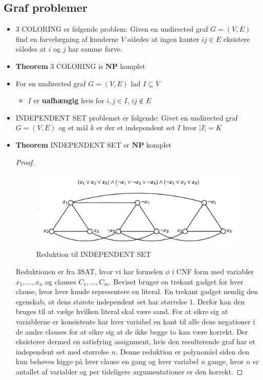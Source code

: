 \subsection{Graf problemer}
\begin{itemize}
  \item 3 COLORING er følgende problem: Given en undirected graf $G=(V,E)$ find en farvelægning af knuderne $V$ således at ingen kanter $ij \in E$ eksistere således at $i$ og $j$ har samme farve.
	\item \textbf{Theorem} 3 COLORING is $\mathbf{NP}$ komplet  
  \item For en undirected graf $G=(V,E)$ lad $I \subseteq V$ 
  \begin{itemize}
  	\item $I$ er \textbf{uafhængig} hvis for $i,j \in I$, $ij \notin E$
  \end{itemize}
  \item INDEPENDENT SET problemet er følgende: Givet en undirected graf $G=(V,E)$ og et mål $k$ er der et independent set $I$ hvor $|I| = K$ 
  \item \textbf{Theorem} INDEPENDENT SET er $\mathbf{NP}$ komplet
  \begin{proof} 
    \begin{figure}[ht]
    	\centering
    	\includegraphics[width=\linewidth]{img/independent}
    	\caption{Reduktion til INDEPENDENT SET\label{label}}
    \end{figure}
    Reduktionen er fra 3SAT, hvor vi har formelen $\phi$ i CNF form med variabler $x_1, \dots, x_n$ og clauses $C_1, \dots, C_m$. Beviset bruger en trekant gadget for hver clause, hvor hver knude representere en literal. En trekant gadget nemlig den egenskab, at dens største independent set har størrelse $1$. Derfor kan den bruges til at vælge hvilken literal skal være sand. For at sikre sig at variablerne er konsistente har hver variabel en kant til alle dens negationer i de andre clauses for at sikre sig at de ikke begge to kan være korrekt. Der eksisterer dermed en satisfying assignment, hvis den resulterende graf har et independent set med størrelse $n$. Denne reduktion er polynomiel siden den kun behøves kigge på hver clause en gang og hver variabel $n$ gange, hvor $n$ er antallet af variabler og per tideligere argumentationer er den korrekt. 


\end{proof}
\end{itemize}
